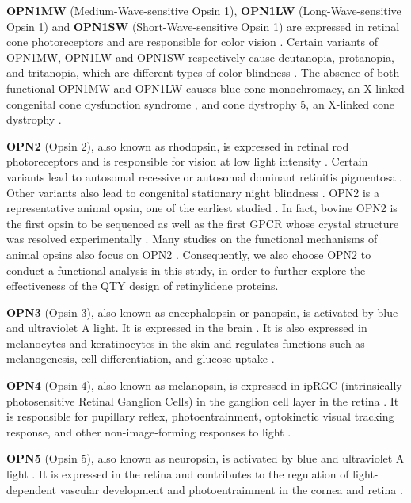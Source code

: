 \documentclass[fleqn,10pt,lineno]{manuscript}
\begin{document}
\textbf{OPN1MW} (Medium-Wave-sensitive Opsin 1), \textbf{OPN1LW} (Long-Wave-sensitive Opsin 1) and \textbf{OPN1SW} (Short-Wave-sensitive Opsin 1) are expressed in retinal cone photoreceptors and are responsible for color vision \citep{Bowmaker_1980}. Certain variants of OPN1MW, OPN1LW and OPN1SW respectively cause deutanopia, protanopia, and tritanopia, which are different types of color blindness \citep{Ueyama_2002, Baraas_2012}. The absence of both functional OPN1MW and OPN1LW causes blue cone monochromacy, an X-linked congenital cone dysfunction syndrome \citep{Wissinger_2022}, and cone dystrophy 5, an X-linked cone dystrophy \citep{Gardner_2010}. 

\textbf{OPN2} (Opsin 2), also known as rhodopsin, is expressed in retinal rod photoreceptors and is responsible for vision at low light intensity \citep{Hubbard_1958}. Certain variants lead to autosomal recessive or autosomal dominant retinitis pigmentosa \citep{Fanelli_2021}. Other variants also lead to congenital stationary night blindness \citep{Fanelli_2021}. OPN2 is a representative animal opsin, one of the earliest studied \citep{Hubbard_1958}. In fact, bovine OPN2 is the first opsin to be sequenced \citep{Nathans_1984} as well as the first GPCR whose crystal structure was resolved experimentally \citep{Palczeski_2000}. Many studies on the functional mechanisms of animal opsins also focus on OPN2 \citep{Park_2008, Scheerer_2008, Kimata_2016}. Consequently, we also choose OPN2 to conduct a functional analysis in this study, in order to further explore the effectiveness of the QTY design of retinylidene proteins. 

\textbf{OPN3} (Opsin 3), also known as encephalopsin or panopsin, is activated by blue and ultraviolet A light. It is expressed in the brain \citep{Blackshaw_1999}. It is also expressed in melanocytes and keratinocytes in the skin and regulates functions such as melanogenesis, cell differentiation, and glucose uptake \citep{Koyanagi_2013, Olinski_2020}. 

\textbf{OPN4} (Opsin 4), also known as melanopsin, is expressed in ipRGC (intrinsically photosensitive Retinal Ganglion Cells) in the ganglion cell layer in the retina \citep{Provencio_1998}. It is responsible for pupillary reflex, photoentrainment, optokinetic visual tracking response, and other non-image-forming responses to light \citep{Berson_2002, Gooley_2003}. 

\textbf{OPN5} (Opsin 5), also known as neuropsin, is activated by blue and ultraviolet A light \citep{Tarttelin_2003, Yamashita_2010}. It is expressed in the retina and contributes to the regulation of light-dependent vascular development \citep{Nguyen_2019} and photoentrainment in the cornea and retina \citep{Buhr_2015}. 
\end{document}
